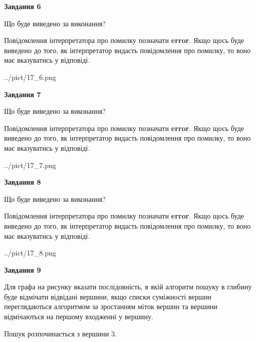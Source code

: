 \documentclass[12pt, ukrainian]{article}
\begin{document}
{\begin {large}
{\begin {center}\textbf{Завдання 6}\end {center}}\par
Що буде виведено за виконання?

Повідомлення інтерпретатора про помилку позначати \textbf{error}.
Якщо щось буде виведено до того, як інтерпретатор видасть повідомлення про помилку, 
то воно має вказуватись у відповіді. \par


\begin{center}
	{../pict/17_6.png}
\end{center}
\newpage

{\begin {center}\textbf{Завдання 7}\end {center}}\par
Що буде виведено за виконання?

Повідомлення інтерпретатора про помилку позначати \textbf{error}.
Якщо щось буде виведено до того, як інтерпретатор видасть повідомлення про помилку, 
то воно має вказуватись у відповіді. \par


\begin{center}
	{../pict/17_7.png}
\end{center}
\newpage

{\begin {center}\textbf{Завдання 8}\end {center}}\par
Що буде виведено за виконання?

Повідомлення інтерпретатора про помилку позначати \textbf{error}.
Якщо щось буде виведено до того, як інтерпретатор видасть повідомлення про помилку, 
то воно має вказуватись у відповіді. \par


\begin{center}
	{../pict/17_8.png}
\end{center}
\newpage

{\begin {center}\textbf{Завдання 9}\end {center}}\par
Для графа на рисунку вказати послідовність, в якій алгоритм пошуку в глибину буде відмічати відвідані вершини, якщо списки суміжності вершин переглядаються алгоритмом за зростанням міток вершин та вершини відмічаються на першому вход\-женні у вершину.\par
Пошук розпочинається з вершини 3.\par


\end{large}}
\end{document}
